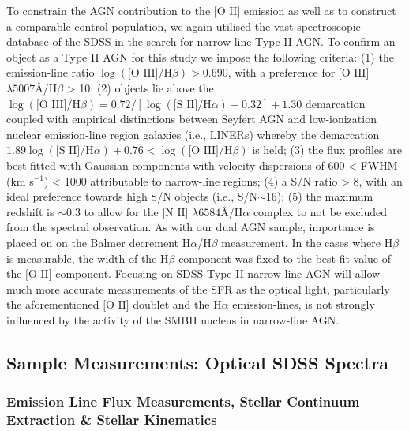 To constrain the AGN contribution to the $\text{[O II]}$ emission as well as to construct a comparable control population, we again utilised the vast spectroscopic database of the SDSS in the search for narrow-line Type II AGN. To confirm an object as a Type II AGN for this study we impose the following criteria: (1) the emission-line ratio $\log(\text{[O III]}/\text{H}\beta)>{0.690}$, with a preference for $\text{[O III]}$ $\lambda{5007}Å$/$\text{H}\beta$ > 10; (2) objects lie above the ${\log{(\text{[O III]}/\text{H}\beta)}}=0.72/[{\log{(\text{[S II]}/\text{H}\alpha)}}-0.32]+1.30$ demarcation coupled with empirical distinctions between Seyfert AGN and low-ionization nuclear emission-line region galaxies (i.e., LINERs) whereby the demarcation ${1.89\log{(\text{[S II]}/\text{H}\alpha)}+0.76}<{\log{(\text{[O III]}/\text{H}\beta)}}$ is held; (3) the flux profiles are best fitted with Gaussian components with velocity dispersions of 600 < FWHM (km s$^{-1}$) < 1000 attributable to narrow-line regions; (4) a S/N ratio > 8, with an ideal preference towards high S/N objects (i.e., S/N$\sim$16); (5) the maximum redshift is $\sim{0.3}$ to allow for the $\text{[N II]}$ $\lambda{6584}Å$/$\text{H}\alpha$ complex to not be excluded from the spectral observation. As with our dual AGN sample, importance is placed on on the Balmer decrement $\text{H}\alpha$/$\text{H}\beta$ measurement. In the cases where $\text{H}\beta$ is measurable, the width of the $\text{H}\beta$ component was fixed to the best-fit value of the $\text{[O II]}$ component. Focusing on SDSS Type II narrow-line AGN will allow much more accurate measurements of the SFR as the optical light, particularly the aforementioned $\text{[O II]}$ doublet and the $\text{H}\alpha$ emission-lines, is not strongly influenced by the activity of the SMBH nucleus in narrow-line AGN.

\subsection{Sample Measurements: Optical SDSS Spectra}

\subsubsection{Emission Line Flux Measurements, Stellar Continuum Extraction \& Stellar Kinematics}

